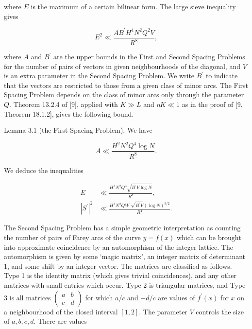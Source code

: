\documentclass[10pt]{article}
\begin{document}
where $E$ is the maximum of a certain bilinear form. The large sieve inequality gives


\begin{equation*}
E^{2} \ll \frac{A B^{\prime} H^{4} N^{2} Q^{2} V}{R^{8}}, \tag{3.2}
\end{equation*}


where $A$ and $B^{\prime}$ are the upper bounds in the First and Second Spacing Problems for the number of pairs of vectors in given neighbourhoods of the diagonal, and $V$ is an extra parameter in the Second Spacing Problem. We write $B^{\prime}$ to indicate that the vectors are restricted to those from a given class of minor arcs. The First Spacing Problem depends on the class of minor arcs only through the parameter $Q$. Theorem 13.2.4 of [9], applied with $K \gg L$ and $\eta K \ll 1$ as in the proof of [9, Theorem 18.1.2], gives the following bound.

Lemma 3.1 (the First Spacing Problem). We have


\begin{equation*}
A \ll \frac{H^{2} N^{2} Q^{4} \log N}{R^{8}}. \tag{3.3}
\end{equation*}


We deduce the inequalities


\begin{equation*}
\begin{aligned}
E &\ll \frac{H^{3} N^{2} Q^{3} \sqrt{B^{\prime} V \log N}}{R^{8}}, \\
\left|S^{\prime}\right|^{2} &\ll \frac{H^{3} N^{2} Q W^{\prime} \sqrt{B^{\prime} V}(\log N)^{9 / 2}}{R^{4}}.
\end{aligned} \tag{3.4}
\end{equation*}


The Second Spacing Problem has a simple geometric interpretation as counting the number of pairs of Farey arcs of the curve $y=f(x)$ which can be brought into approximate coincidence by an automorphism of the integer lattice. The automorphism is given by some `magic matrix', an integer matrix of determinant 1, and some shift by an integer vector. The matrices are classified as follows. Type 1 is the identity matrix (which gives trivial coincidences), and any other matrices with small entries which occur. Type 2 is triangular matrices, and Type 3 is all matrices $\left(\begin{array}{cc}a & b \\ c & d\end{array}\right)$ for which $a / c$ and $-d / c$ are values of $f^{\prime}(x)$ for $x$ on a neighbourhood of the closed interval $[1,2]$. The parameter $V$ controls the size of $a, b, c, d$. There are values
\end{document}
